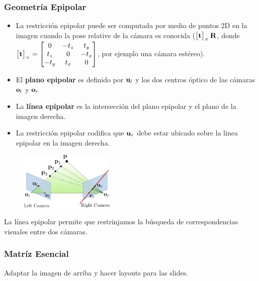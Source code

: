 \begin{frame}
    \frametitle{Geometría Epipolar}
    \footnotesize

    \begin{itemize}
        \item La restricción epipolar puede ser computada por medio de puntos 2D en la imagen cuando la pose relative de la cámara es conocida 
        ($\begin{bmatrix}
            \boldsymbol{\mathbf{t}} 
        \end{bmatrix}_{\times} \boldsymbol{\mathbf{R}}$, donde 
        $\begin{bmatrix}
            \boldsymbol{\mathbf{t}} 
        \end{bmatrix}_{\times} =
        \begin{bmatrix}
            0 & -t_{z} & t_{y}\\
            t_{z} & 0 & -t_{x}\\
            -t_{y} & t_{x} & 0
        \end{bmatrix}$, por ejemplo una cámara estéreo).
        \item El \textbf{plano epipolar} es definido por $\boldsymbol{\mathbf{u}}_{l}$ y los dos centros óptico de las cámaras $\boldsymbol{\mathbf{o}}_{l}$ y $\boldsymbol{\mathbf{o}}_{r}$
        \item La \textbf{línea epipolar} es la intersección del plano epipolar y el plano de la imagen derecha.
        \item La restricción epipolar codifica que $\boldsymbol{\mathbf{u}}_{r}$ debe estar ubicado sobre la linea epipolar en la imagen derecha.
    \end{itemize}

    \begin{figure}
        \includegraphics[width=0.4\textwidth]{./images/epipolar_geometry.pdf}
    \end{figure}

    La línea epipolar permite que restrinjamos la búsqueda de correspondencias visuales entre dos cámaras.

\end{frame}

\begin{frame}
    \frametitle{Matríz Esencial}

    Adaptar la imagen de arriba y hacer layouts para las slides.


\end{frame}


